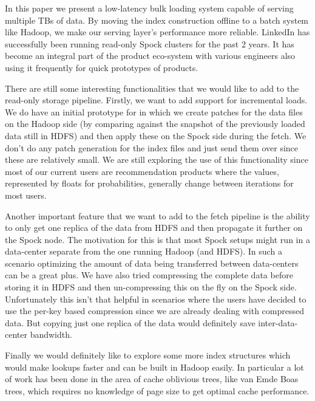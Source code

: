 \documentclass[twocolumn]{article}
\newcommand{\projectname}{Spock}
\begin{document}
In this paper we present a low-latency bulk loading system capable of serving multiple TBs of data. By moving the index construction offline to a batch system like Hadoop, we make our serving layer's performance more reliable. LinkedIn has successfully been running read-only \projectname{} clusters for the past 2 years. It has become an integral part of the product eco-system with various engineers also using it frequently for quick prototypes of products. 

There are still some interesting functionalities that we would like to add to the read-only storage pipeline. Firstly, we want to add support for incremental loads. We do have an initial prototype for in which we create patches for the data files on the Hadoop side (by comparing against the snapshot of the previously loaded data still in HDFS) and then apply these on the \projectname{} side during the fetch. We don't do any patch generation for the index files and just send them over since these are relatively small. We are still exploring the use of this functionality since most of our current users are recommendation products where the values, represented by floats for probabilities, generally change between iterations for most users. 

Another important feature that we want to add to the fetch pipeline is the ability to only get one replica of the data from HDFS and then propagate it further on the \projectname{} node. The motivation for this is that most \projectname{} setups might run in a data-center separate from the one running Hadoop (and HDFS). In such a scenario optimizing the amount of data being transferred between data-centers can be a great plus. We have also tried compressing the complete data before storing it in HDFS and then un-compressing this on the fly on the \projectname{} side. Unfortunately this isn't that helpful in scenarios where the users have decided to use the per-key based compression since we are already dealing with compressed data. But copying just one replica of the data would definitely save inter-data-center bandwidth. 

Finally we would definitely like to explore some more index structures which would make lookups faster and can be built in Hadoop easily. In particular a lot of work has been done in the area of cache oblivious trees, like van Emde Boas trees, which requires no knowledge of page size to get optimal cache performance. 



\end{document}
